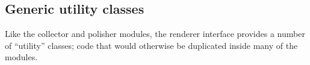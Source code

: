 
\subsection{Generic utility classes}
Like the collector and polisher modules, the renderer interface provides a number of ``utility'' classes; code that
would otherwise be duplicated inside many of the modules.


